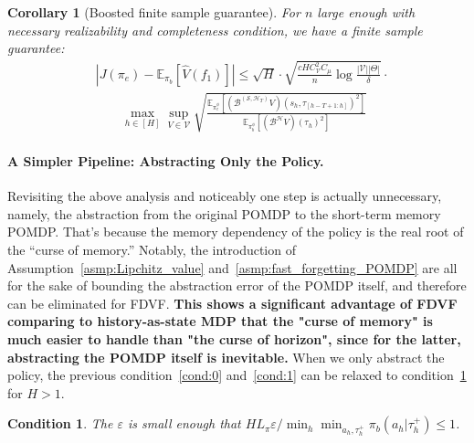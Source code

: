\documentclass[twoside]{article}
\newtheorem{corollary}{Corollary}
\newtheorem{condition}{Condition}
\newcommand{\CAL}[1]{\mathcal{#1}}
\newcommand{\yplu}[1]{{\color{orange}{ [\textbf{Yiping:}} #1]}}
\begin{document}
\begin{corollary}[Boosted finite sample guarantee]\label{coro:finite_sample_2}
    For $n$ large enough with necessary realizability and completeness condition, we have a finite sample guarantee:
    \begingroup
    \allowdisplaybreaks
    \begin{align*}
    &\textstyle|J(\pi_e)-\mathbb{E}_{\pi_b}[\hat{V}(f_1)]|\leq \sqrt{H} \cdot\sqrt{\frac{cHC_{\CAL{V}}^2C_\mu}{n}\log\frac{|\CAL{V}||{\Theta}|}{\delta}} \cdot\\&\qquad\textstyle\max_{h\in[H]}\sup_{V\in\CAL{V}}\sqrt{\frac{\mathbb{E}_{\pi_e^\phi}[(\CAL{B}^{(\CAL{S},\CAL{H}_T)}V)(s_h,\tau_{[h-T+1:h]})^2]}{\mathbb{E}_{\pi_b^\phi}[(\CAL{B^H}V)(\tau_h)^2]}}
    \end{align*}
    \endgroup
\end{corollary}
\paragraph{A Simpler Pipeline: Abstracting Only the Policy.}

Revisiting the above analysis and noticeably one step is actually unnecessary, namely, the abstraction from the original POMDP to the short-term memory POMDP. That's because the memory dependency of the policy is the real root of the “curse of memory.” Notably, the introduction of Assumption~\ref{asmp:Lipchitz_value} %
and~\ref{asmp:fast_forgetting_POMDP} are all for the sake of bounding the abstraction error of the POMDP itself, and therefore can be eliminated for FDVF. \textbf{This shows a significant advantage of FDVF comparing to history-as-state MDP that the "curse of memory" is much easier to handle than "the curse of horizon", since for the latter, abstracting the POMDP itself is inevitable.} When we only abstract the policy, the previous condition~\ref{cond:0} and~\ref{cond:1} can be relaxed to condition~\ref{cond:1'} for $H>1$.
{
\renewcommand\thecondition{2$'$}
\begin{condition}\label{cond:1'}
The $\varepsilon$ is small enough that ${HL_\pi \varepsilon}/{ \min_h\min_{a_h,\tau_h^+}\pi_b(a_h|\tau_h^+)}\leq 1$.
\end{condition}
}
\setcounter{condition}{3}
\end{document}
